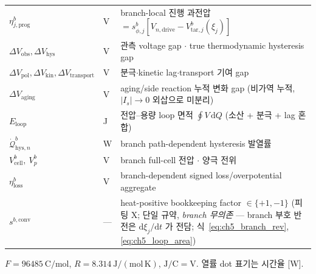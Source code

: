 \documentclass[11pt,a4paper]{article}
\newcommand{\dd}{\mathrm{d}}
\newcommand{\drive}{\mathrm{drive}}
\newcommand{\cell}{\mathrm{cell}}
\newcommand{\prog}{\mathrm{prog}}
\newcommand{\conv}{\mathrm{conv}}
\newcommand{\transp}{\mathrm{transport}}
\newcommand{\hys}{\mathrm{hys}}
\newcommand{\pol}{\mathrm{pol}}
\newcommand{\kin}{\mathrm{kin}}
\newcommand{\obs}{\mathrm{obs}}
\newcommand{\loss}{\mathrm{loss}}
\newcommand{\tar}{\mathrm{tar}}
\begin{document}
\begin{longtable}{p{} p{} >{\raggedright\arraybackslash}p{}}
$\eta_{j,\prog}^b$ & V & branch-local 진행 과전압 $=s_{\phi,j}^b[V_{n,\drive}-V_{\tar,j}^b(\xi_j)]$ \\
$\Delta V_\obs,\Delta V_\hys$ & V & 관측 voltage gap $\cdot$ true thermodynamic hysteresis gap \\
$\Delta V_\pol,\Delta V_\kin,\Delta V_\transp$ & V & 분극$\cdot$kinetic lag$\cdot$transport 기여 gap \\
$\Delta V_{\mathrm{aging}}$ & V & aging/side reaction 누적 변화 gap (비가역 누적, $|I_s|\to0$ 외삽으로 미분리) \\
$E_{\mathrm{loop}}$ & J & 전압--용량 loop 면적 $\oint V\,\dd Q$ (소산 + 분극 + lag 혼합) \\
$\dot{\mathcal Q}_{\hys,n}^b$ & W & branch path-dependent hysteresis 발열률 \\
$V_\cell^b,\ V_p^b$ & V & branch full-cell 전압 $\cdot$ 양극 전위 \\
$\eta_\loss^b$ & V & branch-dependent signed loss/overpotential aggregate \\
$s^{b,\conv}$ & --- & heat-positive bookkeeping factor $\in\{+1,-1\}$ (피팅 X; 단일 규약, \emph{branch 무의존} — branch 부호 반전은 $\dd\xi_j/\dd t$ 가 전담; 식~\eqref{eq:ch5_branch_rev},\allowbreak\eqref{eq:ch5_loop_area}) \\
\bottomrule
\end{longtable}
$F=96485\ \mathrm{C/mol}$, $R=8.314\ \mathrm{J/(mol\,K)}$, $\mathrm{J/C}=\mathrm V$. 열률 dot 표기는 시간율 [W].

\end{document}
